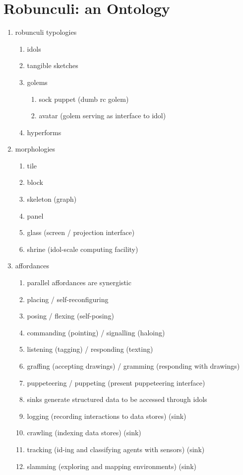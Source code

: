 \section{Robunculi: an Ontology}
\label{sec:robunculi_ontology}
    \begin{enumerate}
        \item robunculi typologies
        \begin{enumerate}
            \item idols
            \item tangible sketches
            \item golems
            \begin{enumerate}
                \item sock puppet (dumb rc golem)
                \item avatar (golem serving as interface to idol)
            \end{enumerate}
            \item hyperforms
        \end{enumerate}
        \item morphologies
        \begin{enumerate}
            \item tile
            \item block
            \item skeleton (graph)
            \item panel
            \item glass (screen / projection interface)
            \item shrine (idol-scale computing facility)
        \end{enumerate}
        \item affordances
        \begin{enumerate}
            \item parallel affordances are synergistic
            \item placing / self-reconfiguring
            \item posing / flexing (self-posing)
            \item commanding (pointing) / signalling (haloing)
            \item listening (tagging) / responding (texting)
            \item graffing (accepting drawings) / gramming (responding with drawings)
            \item puppeteering / puppeting (present puppeteering interface)
            \item sinks generate structured data to be accessed through idols
            \item logging (recording interactions to data stores) (sink)
            \item crawling (indexing data stores) (sink)
            \item tracking (id-ing and classifying agents with sensors) (sink)
            \item slamming (exploring and mapping environments) (sink)
        \end{enumerate}
    \end{enumerate}



